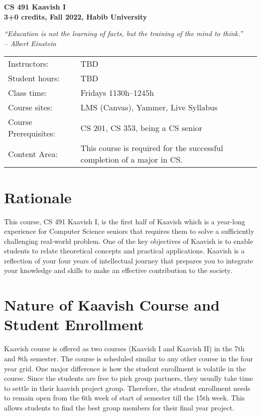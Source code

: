 \documentclass[a4paper]{article}
\newcommand{\new}[1]{{#1}}
\begin{document}
\begin{center}
  {\bfseries {\huge CS 491 Kaavish I}\\\bigskip
    {\large 3+0 credits, Fall 2022, Habib University}}\\\medskip

\textit{``Education is not the learning of facts, but the training of the mind to think.''\\
  -- Albert Einstein}
\end{center}

\noindent
\begin{tabularx}{1.0\linewidth}{lX}
  Instructors: & TBD\\
  Student hours: & TBD\\
  Class time: & Fridays 1130h--1245h\\
  Course sites: & LMS (Canvas), Yammer, Live Syllabus\\
  Course Prerequisites: & CS 201, CS 353, being a CS senior\\
  Content Area: & This course is required for the successful completion of a major in CS.
\end{tabularx}
\medskip

\section{Rationale}
\new{This course, CS 491 Kaavish I, is the first half of Kaavish which is} a year-long experience for Computer Science seniors that requires them to solve a sufficiently challenging real-world problem. One of the key objectives of Kaavish is to enable students to relate theoretical concepts and practical applications. Kaavish is a reflection of your four years of intellectual journey that prepares you to integrate your knowledge and skills to make an effective contribution to the society.

\section{Nature of Kaavish Course and Student Enrollment}
Kaavish course is offered as two courses (Kaavish I and Kaavish II) in the 7th and 8th semester. The course is scheduled similar to any other course in the four year grid. One major difference is how the student enrollment is volatile in the course. Since the students are free to pick group partners,  they usually take time to settle in their kaavish project group. Therefore, the student enrollment needs to remain open from the 6th week of start of semester till the 15th week. This allows students to find the best group members for their final year project.
\end{document}
